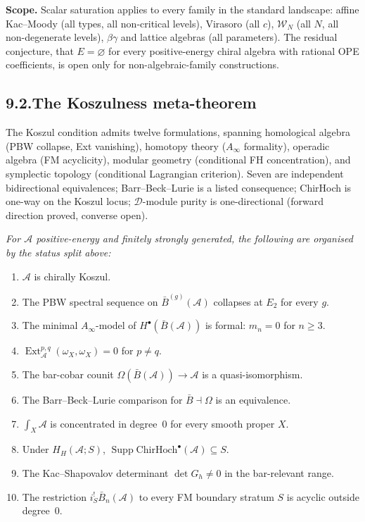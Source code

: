 \documentclass[11pt]{report}
\theoremstyle{definition}
\theoremstyle{remark}
\providecommand{\cA}{\mathcal{A}}
\providecommand{\barB}{\bar{B}}
\providecommand{\ChirHoch}{\mathrm{ChirHoch}}
\numberwithin{equation}{section}
\begin{document}
\medskip
\noindent\textbf{Scope.}\enspace
Scalar saturation applies to every family in the standard landscape:
affine Kac--Moody (all types, all non-critical levels), Virasoro (all
$c$), $\mathcal W_N$ (all $N$, all non-degenerate levels),
$\beta\gamma$ and lattice algebras (all parameters). The residual
conjecture, that $E=\varnothing$ for every positive-energy chiral
algebra with rational OPE coefficients, is open only for
non-algebraic-family constructions.

\subsection*{9.2.\enspace The Koszulness meta-theorem}

The Koszul condition admits twelve formulations, spanning homological
algebra (PBW collapse, Ext vanishing), homotopy theory ($A_\infty$
formality), operadic algebra (FM acyclicity), modular geometry
(conditional FH concentration), and symplectic topology (conditional
Lagrangian criterion). Seven are independent bidirectional
equivalences; Barr--Beck--Lurie is a listed consequence; ChirHoch is
one-way on the Koszul locus; $\mathcal D$-module purity is
one-directional (forward direction proved, converse open).

\begin{center}
\emph{For $\cA$ positive-energy and finitely strongly generated, the
following are organised by the status split above:}
\end{center}

\begin{enumerate}[label=\textup{(\roman*)},nosep]
\item $\cA$ is chirally Koszul.
\item The PBW spectral sequence on $\barB^{(g)}(\cA)$ collapses at $E_2$ for every $g$.
\item The minimal $A_\infty$-model of $H^\bullet(\barB(\cA))$ is formal: $m_n=0$ for $n\ge 3$.
\item $\operatorname{Ext}^{p,q}_\cA(\omega_X,\omega_X)=0$ for $p\neq q$.
\item The bar-cobar counit $\Omega(\barB(\cA))\to\cA$ is a quasi-isomorphism.
\item The Barr--Beck--Lurie comparison for $\barB\dashv\Omega$ is an equivalence.
\item $\int_X\cA$ is concentrated in degree~$0$ for every smooth proper $X$.
\item Under $H_H(\cA;S)$,
 $\operatorname{Supp}\ChirHoch^\bullet(\cA)\subseteq S$.
\item The Kac--Shapovalov determinant $\det G_h\neq 0$ in the bar-relevant range.
\item The restriction $i_S^!\barB_n(\cA)$ to every FM boundary stratum $S$ is acyclic outside degree~$0$.
\end{enumerate}
\end{document}
